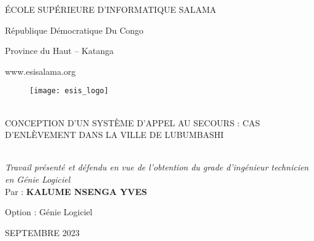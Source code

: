 \begin{titlepage}
	\begin{center}
		\Large
		ÉCOLE SUPÉRIEURE D’INFORMATIQUE SALAMA
		
		\vspace{1.25pt}
		\normalfont
		République Démocratique Du Congo
		
		Province du Haut – Katanga
		
		www.esisalama.org
		
		\vspace{0.5cm}
		
		\begin{figure}[h]
			\texttt{[image: esis\_logo]}
			\centering
		\end{figure}
		
		\vspace{0.5cm}
		\hrulefill\\[0.5cm]
		CONCEPTION D'UN SYSTÈME D’APPEL AU SECOURS : CAS D'ENLÈVEMENT DANS LA VILLE DE LUBUMBASHI\\
		\hrulefill\\[1cm]
		
		\vspace{0.5cm}		
		\hfill
		\begin{minipage}{0.5\textwidth}
			\large
			
			\textit{Travail présenté et défendu en vue de l’obtention du grade d’ingénieur technicien en Génie Logiciel}\\
			
			Par : \textbf{KALUME NSENGA YVES}
			
			Option : Génie Logiciel
		\end{minipage}
		
		\vfill
		\large
		SEPTEMBRE 2023
	\end{center}
\end{titlepage}

